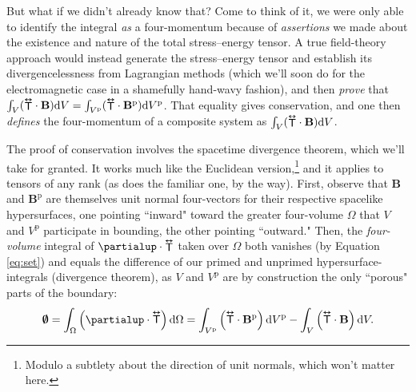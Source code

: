 \documentclass[12pt]{article}
\renewcommand{\vv}[1]{\mathbf{#1}}
\newcommand{\dd}[1]{\mathrm{d}#1}
\newcommand{\tightoverset}[2]{%
  \mathop{#2}\limits^{\vbox to -.5ex{\kern-0.75ex\hbox{$#1$}\vss}}}
\newcommand{\inlinedy}[1]{\tightoverset{\text{\tiny$\bm\leftrightarrow$}}{#1}}
\newcommand{\capdy}[1]{ \overset{ \text{\tiny$\bm\leftrightarrow$} }{\vphantom{\text{\small{A}}}\smash{#1}} }
\begin{document}
But what if we didn't already know that? Come to think of it, we were only able to identify the integral \emph{as} a four-momentum because of \emph{assertions} we made about the existence and nature of the total stress--energy tensor. A true field-theory approach would instead generate the stress--energy tensor and establish its divergencelessness from Lagrangian methods (which we'll soon do for the electromagnetic case in a shamefully hand-wavy fashion), and then \emph{prove} that ${\int_V ({\inlinedy{\mathsf{T}}} \cdot \vv B) \dd V} = \int_{V^\textrm{p}} ({\inlinedy{\mathsf{T}}} \cdot \vv B^{\textrm{p}}) \dd V^\textrm{p}$. That equality gives conservation, and one then \emph{defines} the four-momentum of a composite system as ${\int_V ({\inlinedy{\mathsf{T}}} \cdot \vv B) \dd V}$.

The proof of conservation involves the spacetime divergence theorem, which we'll take for granted. It works much like the Euclidean version,\footnote{Modulo a subtlety about the direction of unit normals, which won't matter here.} and it applies to tensors of any rank (as does the familiar one, by the way). First, observe that $\vv B$ and $\vv B^\textrm{p}$ are themselves unit normal four-vectors for their respective spacelike hypersurfaces, one pointing ``inward" toward the greater four-volume $\Omega$ that $V$ and $V^\textrm{p}$ participate in bounding, the other pointing ``outward." Then, the \emph{four-volume} integral of $\partialup \cdot {\inlinedy{\mathsf{T}}}$ taken over $\Omega$ both vanishes (by Equation \ref{eq:set}) and equals the difference of our primed and unprimed hypersurface-integrals (divergence theorem), as $V$ and $V^\textrm{p}$ are by construction the only ``porous" parts of the boundary:
\begin{equation*}
\textrm{\mbox{\boldmath $\emptyset$}} = \int_{\Omega} \left( \partialup \cdot {\capdy{\mathsf{T}}} \right) \dd \Omega =  \int_{V^\textrm{p}} \left( {\capdy{\mathsf{T}}} \cdot \vv B^{\textrm{p}} \right) \dd V^\textrm{p} - \int_V \left( {\capdy{\mathsf{T}}} \cdot \vv B \right) \dd V .
\end{equation*}
\end{document}
